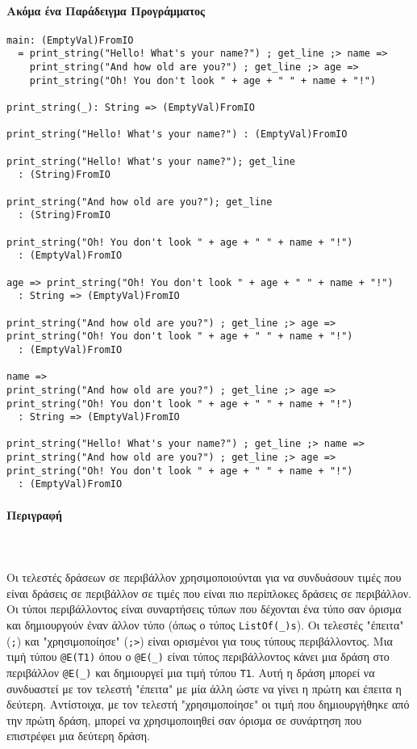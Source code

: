 \documentclass[diploma]{softlab-thesis}
\def\pend{\mbox{}\\\\}
\begin{document}
\newpage
\paragraph{Ακόμα ένα Παράδειγμα Προγράμματος}
\begin{verbatim}
main: (EmptyVal)FromIO
  = print_string("Hello! What's your name?") ; get_line ;> name =>
    print_string("And how old are you?") ; get_line ;> age =>
    print_string("Oh! You don't look " + age + " " + name + "!")

print_string(_): String => (EmptyVal)FromIO

print_string("Hello! What's your name?") : (EmptyVal)FromIO

print_string("Hello! What's your name?"); get_line
  : (String)FromIO

print_string("And how old are you?"); get_line
  : (String)FromIO

print_string("Oh! You don't look " + age + " " + name + "!")
  : (EmptyVal)FromIO

age => print_string("Oh! You don't look " + age + " " + name + "!")
  : String => (EmptyVal)FromIO

print_string("And how old are you?") ; get_line ;> age =>
print_string("Oh! You don't look " + age + " " + name + "!")
  : (EmptyVal)FromIO

name =>
print_string("And how old are you?") ; get_line ;> age =>
print_string("Oh! You don't look " + age + " " + name + "!")
  : String => (EmptyVal)FromIO

print_string("Hello! What's your name?") ; get_line ;> name =>
print_string("And how old are you?") ; get_line ;> age =>
print_string("Oh! You don't look " + age + " " + name + "!")
  : (EmptyVal)FromIO
\end{verbatim}

\paragraph{Περιγραφή}\pend
Οι τελεστές δράσεων σε περιβάλλον χρησιμοποιούνται για να συνδυάσουν τιμές που
είναι δράσεις σε περιβάλλον σε τιμές που είναι πιο περίπλοκες δράσεις σε
περιβάλλον. Οι τύποι περιβάλλοντος είναι συναρτήσεις τύπων που δέχονται ένα
τύπο σαν όρισμα και δημιουργούν έναν άλλον τύπο (όπως ο τύπος
\verb|ListOf(_)s|). Οι τελεστές "έπειτα" (\verb|;|) και "χρησιμοποίησε"
(\verb|;>|) είναι ορισμένοι για τους τύπους περιβάλλοντος. Μια τιμή τύπου
\verb|@E(T1)| όπου ο \verb|@E(_)| είναι τύπος περιβάλλοντος κάνει μια δράση
στο περιβάλλον \verb|@E(_)| και δημιουργεί μια τιμή τύπου \verb|T1|. Αυτή η
δράση μπορεί να συνδυαστεί με τον τελεστή "έπειτα" με μία άλλη ώστε να γίνει
η πρώτη και έπειτα η δεύτερη. Αντίστοιχα, με τον τελεστή "χρησιμοποίησε"
οι τιμή που δημιουργήθηκε από την πρώτη δράση, μπορεί να χρησιμοποιηθεί σαν
όρισμα σε συνάρτηση που επιστρέφει μια δεύτερη δράση.
\end{document}
